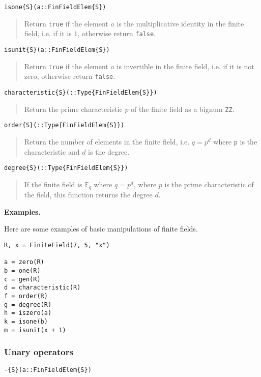 \documentclass[a4paper,10pt]{article}
\newcommand{\F}{\mathbb{F}}
\newcommand{\code}{\lstinline}
\newcommand{\desc}[1]{\vspace{-3mm}\begin{quote}#1\end{quote}}
\begin{document}
{{\begin{lstlisting}
isone{S}(a::FinFieldElem{S})
\end{lstlisting}

\desc{Return \code{true} if the element $a$ is the multiplicative identity in
the finite field, i.e. if it is $1$, otherwise return \code{false}.}

\begin{lstlisting}
isunit{S}(a::FinFieldElem{S})
\end{lstlisting}

\desc{Return \code{true} if the element $a$ is invertible in the finite field,
i.e. if it is not zero, otherwise return \code{false}.}

\begin{lstlisting}
characteristic{S}(::Type{FinFieldElem{S}})
\end{lstlisting}

\desc{Return the prime characteristic $p$ of the finite field as a bignum
\code{ZZ}.}

\begin{lstlisting}
order{S}(::Type{FinFieldElem{S}})
\end{lstlisting}

\desc{Return the number of elements in the finite field, i.e. $q = p^d$
where \code{p} is the characteristic and $d$ is the degree.}

\begin{lstlisting}
degree{S}(::Type{FinFieldElem{S}})
\end{lstlisting}

\desc{If the finite field is $\F_q$ where $q = p^d$, where $p$ is the
prime characteristic of the field, this function returns the degree
$d$.}

\textbf{Examples.}

Here are some examples of basic manipulations of finite fields.

\begin{lstlisting}
R, x = FiniteField(7, 5, "x")

a = zero(R)
b = one(R)
c = gen(R)
d = characteristic(R)
f = order(R)
g = degree(R)
h = iszero(a)
k = isone(b)
m = isunit(x + 1)
\end{lstlisting}

\subsubsection{Unary operators}

\begin{lstlisting}
-{S}(a::FinFieldElem{S})
\end{lstlisting}

}}
\end{document}
